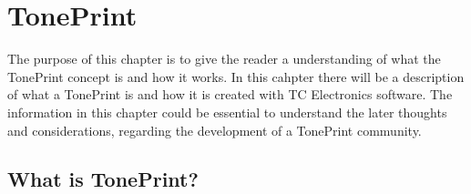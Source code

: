 \chapter{TonePrint}
\label{TonePrintConcept}

The purpose of this chapter is to give the reader a understanding of what the TonePrint concept is and how it works. In this cahpter there will be a description of what a TonePrint is and how it is created with TC Electronics software. The information in this chapter could be essential to understand the later thoughts and considerations, regarding the development of a TonePrint community.

\section{What is TonePrint?}
\label{WhatIsTonePrint}

